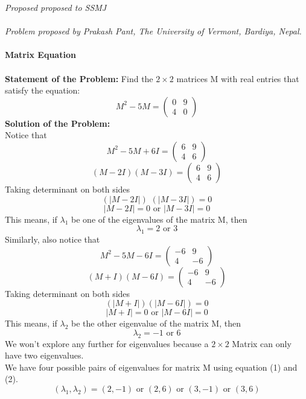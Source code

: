 \documentclass[12pt]{article}
\begin{document}
\textit{Proposed proposed to SSMJ }\\ \\
\textit{Problem proposed by Prakash Pant, The University of Vermont, Bardiya, Nepal.}\\ \\
\textbf{Matrix Equation
} \\ \\
\textbf{Statement of the Problem:}
Find the \( 2 \times 2\) matrices M with real entries that satisfy the equation:\\
\[ M^2 - 5M  = 
\begin{pmatrix}
0 & 9 \\
4 & 0
\end{pmatrix}
\] 
\textbf{Solution of the Problem:} \\

Notice that \[ M^2 - 5M + 6I = \begin{pmatrix} 6 & 9 \\ 4 & 6 \end{pmatrix} \]
\[ (M - 2I) ( M - 3I) = \begin{pmatrix} 6 & 9 \\ 4 & 6   \end{pmatrix} \]
Taking determinant on both sides 
\[ (|M-2I|)\,\, (|M-3I|) = 0 
\]
\[ |M-2I| = 0 \text{ or } |M-3I| = 0 \]
This means, if \( \lambda_1\) be one of the eigenvalues of the matrix M, then 
\begin{equation} \lambda_1 = 2 \text{ or } 3 \end{equation}
Similarly, also notice that 
\[ M^2 - 5M -6I = \begin{pmatrix}  -6 & 9 \\ 4 & -6  \end{pmatrix} \]
\[ (M+I) (M-6I) = \begin{pmatrix} -6 & 9 \\ 4 & -6   \end{pmatrix} \]
Taking determinant on both sides 
\[ (|M+I|) (|M-6I|) = 0 \]
\[ |M+I|=0 \text{ or } |M-6I| = 0 \]
This means, if \( \lambda_2\) be the other eigenvalue of the matrix M, then 
\begin{equation} \lambda_2 = -1 \text{ or } 6 \end{equation}
We won't explore any further for eigenvalues because a \( 2 \times 2\) Matrix can only have two eigenvalues. \\
We have four possible pairs of eigenvalues for matrix M using equation (1) and (2). 
\[ (\lambda_1,\lambda_2) = (2,-1) \text{ or } (2,6) \text{ or } (3,-1) \text{ or } (3,6)\]
\end{document}
